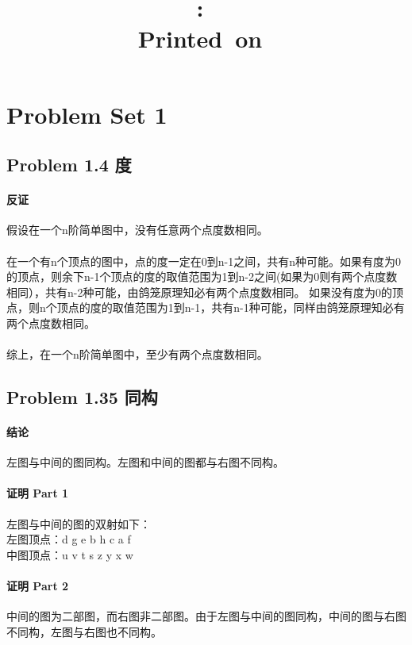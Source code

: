 \documentclass[17pt,UTF-8,a4paper]{ctexart}
\title{
    \vspace{2in}
    \textmd{\textbf{\hmwkClass:\ \hmwkTitle}}\\
    \normalsize\vspace{0.1in}\small{Printed\ on\ \hmwkDueDate}\\
    \vspace{0.1in}\large{\textit{\hmwkClassInstructor}}
    \vspace{3in}
}
\author{\hmwkAuthorName}
\date{}
\begin{document}


\section*{Problem Set 1}

\subsection*{Problem 1.4 度}
\paragraph*{反证}
假设在一个n阶简单图中，没有任意两个点度数相同。
\paragraph*{}
在一个有n个顶点的图中，点的度一定在0到n-1之间，共有n种可能。如果有度为0的顶点，则余下n-1个顶点的度的取值范围为1到n-2之间(如果为0则有两个点度数相同），共有n-2种可能，由鸽笼原理知必有两个点度数相同。
如果没有度为0的顶点，则n个顶点的度的取值范围为1到n-1，共有n-1种可能，同样由鸽笼原理知必有两个点度数相同。
\paragraph*{}
综上，在一个n阶简单图中，至少有两个点度数相同。


\subsection*{Problem 1.35 同构}




\paragraph*{结论}
左图与中间的图同构。左图和中间的图都与右图不同构。

\paragraph*{证明 Part 1}
左图与中间的图的双射如下：\\
左图顶点：d g e b h c a f\\
中图顶点：u v t s z y x w 

\paragraph*{证明 Part 2}
中间的图为二部图，而右图非二部图。由于左图与中间的图同构，中间的图与右图不同构，左图与右图也不同构。
\end{document}
